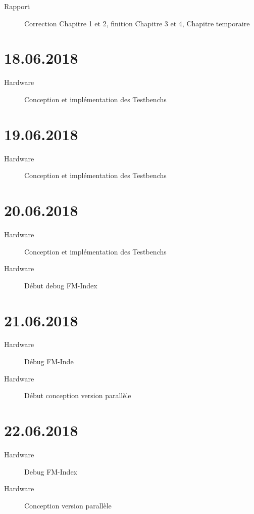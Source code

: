 \begin{description}
	\item [Rapport] Correction Chapitre 1 et 2, finition Chapitre 3 et 4, Chapitre temporaire
\end{description}

\section*{18.06.2018}

\begin{description}
	\item [Hardware] Conception et implémentation des Testbenchs
\end{description}

\section*{19.06.2018}

\begin{description}
	\item [Hardware] Conception et implémentation des Testbenchs
\end{description}

\section*{20.06.2018}

\begin{description}
	\item [Hardware] Conception et implémentation des Testbenchs
	\item [Hardware] Début debug FM-Index
\end{description}

\section*{21.06.2018}

\begin{description}
    \item [Hardware] Débug FM-Inde
	\item [Hardware] Début conception version parallèle
	\end{description}

\section*{22.06.2018}

\begin{description}
	\item [Hardware] Debug FM-Index
	\item [Hardware] Conception version parallèle
\end{description}


